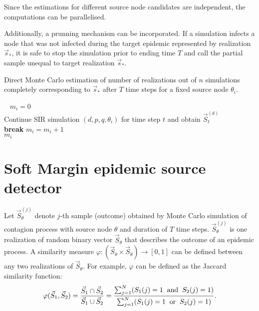 \documentclass[times, utf8, diplomski]{fer}
\begin{document}
 Since the estimations for different source node candidates are independent, the computations can be parallelised.  

Additionally, a prunning mechanism can be incorporated. If a simulation infects a node that was not infected during the target epidemic  represented by  realization $\vec s_*$, it is safe to stop the simulation prior to ending time $T$ and call the partial sample unequal to target realization $\vec s_*$.

\vspace{5mm}
\begin{algorithm}[H]
\label{DMC_lag}
 \caption{Direct Monte Carlo estimation of number of realizations out of $n$ simulations completely corresponding to $\vec s_*$ after $T$ time steps  for a fixed source node $\theta_i$.}
\ 
 $m_i = 0$\\ 
  {
    {
    Continue SIR simulation $(d, p, q, \theta_i)$ for time step $t$ and obtain
    $\vec S_t^{(d)}$ \\
     {
   \textbf{break}
    }
   }
     {
  $m_i = m_i + 1$\\
 }
 }
  \Return $m_i$
\end{algorithm}

\section{Soft Margin epidemic source detector}
Let $\vec S^{(j)}_{\theta}$ denote $j$-th sample (outcome) obtained by Monte Carlo simulation of contagion process with source node $\theta$ and duration of $T$ time steps. $\vec S^{(j)}_{\theta}$ is one realization of random binary vector $\vec S_{\theta}$ that describes the outcome of an epidemic process. A similarity measure $\varphi : (\vec S_{\theta} \times \vec S_{\theta}) \rightarrow [0, 1 ]$  can  be defined between any two  realizations of $\vec S_{\theta}$. For example,  $\varphi$ can be defined as the Jaccard similarity function:
\begin{equation}
\varphi(\vec S_1, \vec S_2) = \frac{\vec S_1 \cap \vec S_2}{\vec S_1 \cup \vec S_2 } = \frac{\sum_{j = 1}^{N} (S_1(j) = 1 \hspace{2mm} \text{and} \hspace{2mm} S_2(j) = 1) }{\sum_{j = 1}^{N} (S_1(j) = 1 \hspace{2mm} \text{or} \hspace{2mm} S_2(j) = 1) }.
\label{JaccardPHI}
\end{equation}
\end{document}
